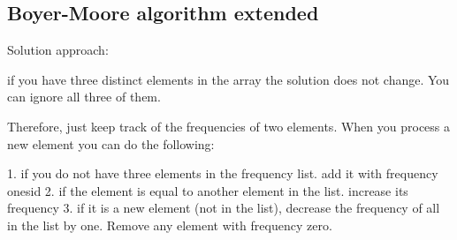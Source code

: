 \subsection{Boyer-Moore algorithm extended}
\label{find_repeated_number_n_divided_3_times:sec:boyer_moore_extended}
Solution approach:

if you have three distinct elements in the array the solution does not change. You can ignore all three of them.

Therefore, just keep track of the frequencies of two elements.
When you process a new element you can do the following:

1. if you do not have three elements in the frequency list. add it with frequency onesid
2. if the element is equal to another element in the list. increase its frequency
3. if it is a new element (not in the list), decrease the frequency of all in the list by one. Remove any element with frequency zero.
\begin{minipage}{\linewidth}
	
\end{minipage}